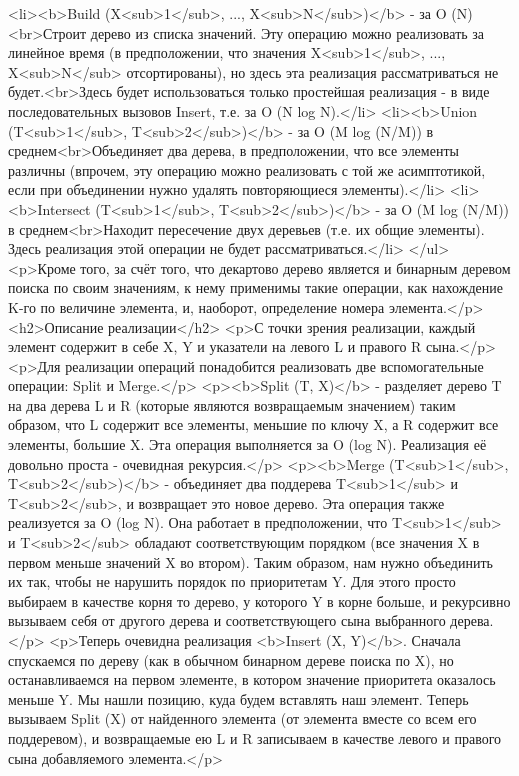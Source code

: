 <li><b>Build (X<sub>1</sub>, ..., X<sub>N</sub>)</b> - за O (N)<br>Строит дерево из списка значений. Эту операцию можно реализовать за линейное время (в предположении, что значения X<sub>1</sub>, ..., X<sub>N</sub> отсортированы), но здесь эта реализация рассматриваться не будет.<br>Здесь будет использоваться только простейшая реализация - в виде последовательных вызовов Insert, т.е. за O (N log N).</li>
<li><b>Union (T<sub>1</sub>, T<sub>2</sub>)</b> - за O (M log (N/M)) в среднем<br>Объединяет два дерева, в предположении, что все элементы различны (впрочем, эту операцию можно реализовать с той же асимптотикой, если при объединении нужно удалять повторяющиеся элементы).</li>
<li><b>Intersect (T<sub>1</sub>, T<sub>2</sub>)</b> - за O (M log (N/M)) в среднем<br>Находит пересечение двух деревьев (т.е. их общие элементы). Здесь реализация этой операции не будет рассматриваться.</li>
</ul>
<p>Кроме того, за счёт того, что декартово дерево является и бинарным деревом поиска по своим значениям, к нему применимы такие операции, как нахождение K-го по величине элемента, и, наоборот, определение номера элемента.</p>
<h2>Описание реализации</h2>
<p>С точки зрения реализации, каждый элемент содержит в себе X, Y и указатели на левого L и правого R сына.</p>
<p>Для реализации операций понадобится реализовать две вспомогательные операции: Split и Merge.</p>
<p><b>Split (T, X)</b> - разделяет дерево T на два дерева L и R (которые являются возвращаемым значением) таким образом, что L содержит все элементы, меньшие по ключу X, а R содержит все элементы, большие X. Эта операция выполняется за O (log N). Реализация её довольно проста - очевидная рекурсия.</p>
<p><b>Merge (T<sub>1</sub>, T<sub>2</sub>)</b> - объединяет два поддерева T<sub>1</sub> и T<sub>2</sub>, и возвращает это новое дерево. Эта операция также реализуется за O (log N). Она работает в предположении, что T<sub>1</sub> и T<sub>2</sub> обладают соответствующим порядком (все значения X в первом меньше значений X во втором). Таким образом, нам нужно объединить их так, чтобы не нарушить порядок по приоритетам Y. Для этого просто выбираем в качестве корня то дерево, у которого Y в корне больше, и рекурсивно вызываем себя от другого дерева и соответствующего сына выбранного дерева.</p>
<p>Теперь очевидна реализация <b>Insert (X, Y)</b>. Сначала спускаемся по дереву (как в обычном бинарном дереве поиска по X), но останавливаемся на первом элементе, в котором значение приоритета оказалось меньше Y. Мы нашли позицию, куда будем вставлять наш элемент. Теперь вызываем Split (X) от найденного элемента (от элемента вместе со всем его поддеревом), и возвращаемые ею L и R записываем в качестве левого и правого сына добавляемого элемента.</p>
